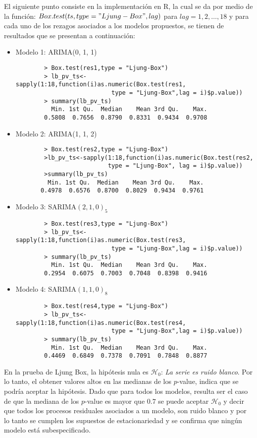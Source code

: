 \documentclass{article}
\theoremstyle{remark}
\begin{document}
El siguiente punto consiste en la implementación en R, la cual se da por medio de la función: $Box.test(ts,type = "Ljung-Box", lag)$  para $lag = 1, 2, \dots,  18$ y para cada uno de los rezagos asociados a los modelos propuestos, se tienen de resultados que se presentan a continuación:\\
\begin{itemize}
    \item Modelo 1: ARIMA(0, 1, 1)
    \begin{verbatim}
        > Box.test(res1,type = "Ljung-Box")
        > lb_pv_ts<-sapply(1:18,function(i)as.numeric(Box.test(res1,
                           type = "Ljung-Box",lag = i)$p.value))
        > summary(lb_pv_ts) 
          Min. 1st Qu.  Median    Mean 3rd Qu.    Max. 
        0.5808  0.7656  0.8790  0.8331  0.9434  0.9708 
    \end{verbatim}
    \item Modelo 2: ARIMA(1, 1, 2)
    \begin{verbatim}
        > Box.test(res2,type = "Ljung-Box")
        >lb_pv_ts<-sapply(1:18,function(i)as.numeric(Box.test(res2,
                          type = "Ljung-Box", lag = i)$p.value))
        >summary(lb_pv_ts) 
         Min. 1st Qu.  Median    Mean 3rd Qu.    Max. 
       0.4978  0.6576  0.8700  0.8029  0.9434  0.9761 
    \end{verbatim}
    \item Modelo 3: SARIMA$(2, 1, 0)_5$
    \begin{verbatim}
        > Box.test(res3,type = "Ljung-Box")
        > lb_pv_ts<-sapply(1:18,function(i)as.numeric(Box.test(res3,
                           type = "Ljung-Box",lag = i)$p.value))
        > summary(lb_pv_ts) 
          Min. 1st Qu.  Median    Mean 3rd Qu.    Max. 
        0.2954  0.6075  0.7003  0.7048  0.8398  0.9416 
    \end{verbatim}
    \item Modelo 4: SARIMA$(1, 1, 0)_8$
    \begin{verbatim}
        > Box.test(res4,type = "Ljung-Box")
        > lb_pv_ts<-sapply(1:18,function(i)as.numeric(Box.test(res4,
                           type = "Ljung-Box",lag = i)$p.value))
        > summary(lb_pv_ts) 
          Min. 1st Qu.  Median    Mean 3rd Qu.    Max. 
        0.4469  0.6849  0.7378  0.7091  0.7848  0.8877 
    \end{verbatim}
\end{itemize}

En la prueba de Ljung Box, la hipótesis nula es $\mathscr{H}_0$: \textit{La serie es ruido blanco}. Por lo tanto, el obtener valores altos en las medianas de los \(p\)-value, indica que se podría aceptar la hipótesis. Dado que para todos los modelos, resulta ser el caso de que la mediana de los \(p\)-value es mayor que $0.7$ se puede aceptar $\mathscr{H}_0$ y decir que todos los procesos residuales asociados a un modelo, son ruido blanco y por lo tanto se cumplen los supuestos de estacionariedad y se confirma que ningún modelo está subespecificado.\\
\end{document}
